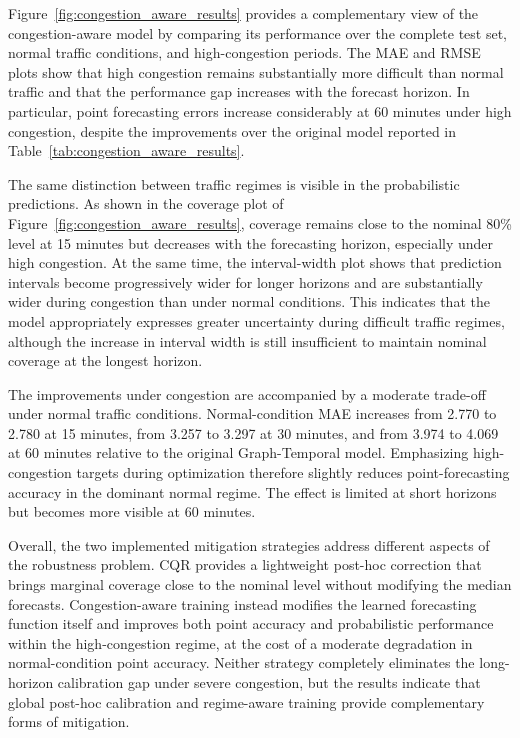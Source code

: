 Figure~\ref{fig:congestion_aware_results} provides a complementary view of
the congestion-aware model by comparing its performance over the complete
test set, normal traffic conditions, and high-congestion periods. The MAE
and RMSE plots show that high congestion remains substantially more difficult
than normal traffic and that the performance gap increases with the forecast
horizon. In particular, point forecasting errors increase considerably at
60 minutes under high congestion, despite the improvements over the original
model reported in Table~\ref{tab:congestion_aware_results}.

The same distinction between traffic regimes is visible in the probabilistic
predictions. As shown in the coverage plot of
Figure~\ref{fig:congestion_aware_results}, coverage remains close to the
nominal 80\% level at 15 minutes but decreases with the forecasting horizon,
especially under high congestion. At the same time, the interval-width plot
shows that prediction intervals become progressively wider for longer
horizons and are substantially wider during congestion than under normal
conditions. This indicates that the model appropriately expresses greater
uncertainty during difficult traffic regimes, although the increase in
interval width is still insufficient to maintain nominal coverage at the
longest horizon.

The improvements under congestion are accompanied by a moderate trade-off
under normal traffic conditions. Normal-condition MAE increases from 2.770
to 2.780 at 15 minutes, from 3.257 to 3.297 at 30 minutes, and from 3.974
to 4.069 at 60 minutes relative to the original Graph-Temporal model.
Emphasizing high-congestion targets during optimization therefore slightly
reduces point-forecasting accuracy in the dominant normal regime. The effect
is limited at short horizons but becomes more visible at 60 minutes.

Overall, the two implemented mitigation strategies address different aspects
of the robustness problem. CQR provides a lightweight post-hoc correction
that brings marginal coverage close to the nominal level without modifying
the median forecasts. Congestion-aware training instead modifies the learned
forecasting function itself and improves both point accuracy and probabilistic
performance within the high-congestion regime, at the cost of a moderate
degradation in normal-condition point accuracy. Neither strategy completely
eliminates the long-horizon calibration gap under severe congestion, but the
results indicate that global post-hoc calibration and regime-aware training
provide complementary forms of mitigation.

